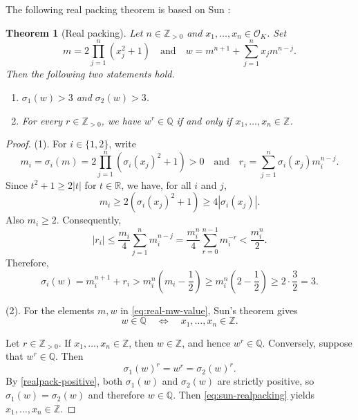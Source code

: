 \documentclass[12pt]{amsart}
\numberwithin{equation}{section}
\newtheorem{theorem}{Theorem}[section]
\theoremstyle{remark}
\theoremstyle{plain}
\newcommand{\Z}{\mathbb{Z}}
\newcommand{\Q}{\mathbb{Q}}
\newcommand{\R}{\mathbb{R}}
\newcommand{\sO}{\mathcal{O}}
\begin{document}
The following real packing theorem is based on Sun \cite[Theorem~3.1]{Sun26}:
\begin{theorem}[Real packing]\label{thm:realpacking}
Let $n\in\Z_{>0}$ and $x_1,\ldots,x_n\in\sO_K$. Set
\begin{equation}\label{eq:real-mw-value}
m=2\prod_{j=1}^n(x_j^2+1)\quad\text{and}\quad w=m^{n+1}+\sum_{j=1}^n x_jm^{n-j}.
\end{equation}
Then the following two statements hold.
\begin{enumerate}[label=\textup{(\arabic*)}]
\item\label{realpack-positive}$\sigma_1(w)>3$ and $\sigma_2(w)>3$.

\item For every $r\in\Z_{>0}$, we have $w^r\in\Q$ if and only if $x_1,\ldots,x_n\in\Z$.
\end{enumerate}
\end{theorem}
\begin{proof}
\textup{(1)}. For $i\in\{1,2\}$, write
\[
m_i=\sigma_i(m)=2\prod_{j=1}^n\left(\sigma_i(x_j)^2+1\right)>0\quad\text{and}\quad r_i=\sum_{j=1}^n\sigma_i(x_j)m_i^{n-j}.
\]
Since $t^2+1\geq2|t|$ for $t\in\R$, we have, for all $i$ and $j$,
\[
m_i\geq2\left(\sigma_i(x_j)^2+1\right)\geq4|\sigma_i(x_j)|.
\]
Also $m_i\geq2$. Consequently,
\[
|r_i|\leq\frac{m_i}{4}\sum_{j=1}^n m_i^{n-j}=\frac{m_i^n}{4}\sum_{r=0}^{n-1}m_i^{-r}<\frac{m_i^n}{2}.
\]
Therefore,
\[
\sigma_i(w)=m_i^{n+1}+r_i>m_i^n\left(m_i-\frac{1}{2}\right)\geq m_i^n\left(2-\frac{1}{2}\right)\geq2\cdot\frac{3}{2}=3.
\]

\smallskip

\textup{(2)}. For the elements $m,w$ in \eqref{eq:real-mw-value}, Sun's theorem \cite[Theorem~3.1]{Sun26} gives
\begin{equation}\label{eq:sun-realpacking}
w\in\Q\quad\Longleftrightarrow\quad x_1,\ldots,x_n\in\Z.
\end{equation}

Let $r\in\Z_{>0}$. If $x_1,\ldots,x_n\in\Z$, then $w\in\Z$, and hence $w^r\in\Q$.
Conversely, suppose that $w^r\in\Q$. Then
\[
\sigma_1(w)^r=w^r=\sigma_2(w)^r.
\]
By \ref{realpack-positive}, both $\sigma_1(w)$ and $\sigma_2(w)$ are strictly positive, so $\sigma_1(w)=\sigma_2(w)$ and therefore $w\in\Q$. Then \eqref{eq:sun-realpacking} yields $x_1,\ldots,x_n\in\Z$.
\end{proof}
\end{document}
